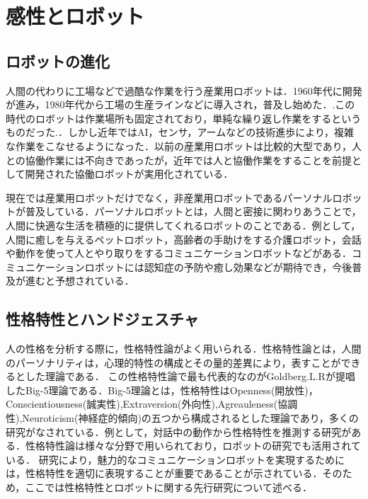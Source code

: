 \section{感性とロボット}
\label{sec2.3}

\subsection{ロボットの進化}
\label{sec2.3.1}
人間の代わりに工場などで過酷な作業を行う産業用ロボットは．1960年代に開発が進み，1980年代から工場の生産ラインなどに導入され，普及し始めた．.この時代のロボットは作業場所も固定されており，単純な繰り返し作業をするというものだった.．しかし近年ではAI，センサ，アームなどの技術進歩により，複雑な作業をこなせるようになった．以前の産業用ロボットは比較的大型であり，人との協働作業には不向きであったが，近年では人と協働作業をすることを前提として開発された協働ロボットが実用化されている．

現在では産業用ロボットだけでなく，非産業用ロボットであるパーソナルロボットが普及している．パーソナルロボットとは，人間と密接に関わりあうことで，人間に快適な生活を積極的に提供してくれるロボットのことである．例として，人間に癒しを与えるペットロボット，高齢者の手助けをする介護ロボット，会話や動作を使って人とやり取りをするコミュニケーションロボットなどがある．コミュニケーションロボットには認知症の予防や癒し効果などが期待でき，今後普及が進むと予想されている．


\subsection{性格特性とハンドジェスチャ}
\label{sec2.3.2}

人の性格を分析する際に，性格特性論がよく用いられる．性格特性論とは，人間のパーソナリティは，心理的特性の構成とその量的差異により，表すことができるとした理論である．
この性格特性論で最も代表的なのがGoldberg.L.Rが提唱したBig-5理論である．Big-5理論とは，性格特性はOpenness(開放性)，Conscientiousness(誠実性),Extraversion(外向性),Agreauleness(協調性),Neuroticism(神経症的傾向)の五つから構成されるとした理論であり，多くの研究がなされている．例として，対話中の動作から性格特性を推測する研究がある\cite{性格特性推測}．性格特性論は様々な分野で用いられており，ロボットの研究でも活用されている．
研究により，魅力的なコミュニケーションロボットを実現するためには，性格特性を適切に表現することが重要であることが示されている\cite{ロボットの性格特性1}\cite{ロボットの性格特性2}\cite{ロボットの性格特性3}．そのため，ここでは性格特性とロボットに関する先行研究について述べる．


